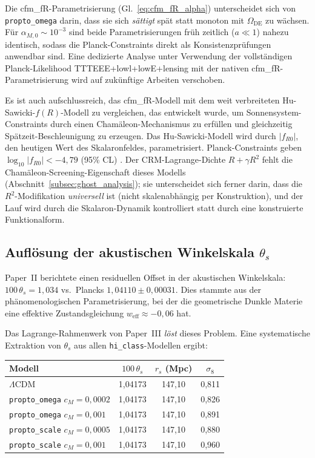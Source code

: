 \documentclass[11pt,a4paper]{article}
\begin{document}
Die cfm\_fR-Parametrisierung (Gl.~\ref{eq:cfm_fR_alpha}) unterscheidet sich von \texttt{propto\_omega} darin, dass sie sich \textit{s\"attigt} sp\"at statt monoton mit $\Omega_{\mathrm{DE}}$ zu w\"achsen. F\"ur $\alpha_{M,0} \sim 10^{-3}$ sind beide Parametrisierungen fr\"uh zeitlich ($a \ll 1$) nahezu identisch, sodass die Planck-Constraints direkt als Konsistenzpr\"ufungen anwendbar sind. Eine dedizierte Analyse unter Verwendung der vollst\"andigen Planck-Likelihood TTTEEE+lowl+lowE+lensing mit der nativen cfm\_fR-Parametrisierung wird auf zuk\"unftige Arbeiten verschoben.

Es ist auch aufschlussreich, das cfm\_fR-Modell mit dem weit verbreiteten Hu-Sawicki-$f(R)$-Modell \cite{HuSawicki2007} zu vergleichen, das entwickelt wurde, um Sonnensystem-Constraints durch einen Cham\"aleon-Mechanismus zu erf\"ullen und gleichzeitig Sp\"atzeit-Beschleunigung zu erzeugen. Das Hu-Sawicki-Modell wird durch $|f_{R0}|$, den heutigen Wert des Skalaronfeldes, parametrisiert. Planck-Constraints geben $\log_{10}|f_{R0}| < -4{,}79$ (95\% CL) \cite{PlanckMG2016}. Der CRM-Lagrange-Dichte $R + \gamma R^2$ fehlt die Cham\"aleon-Screening-Eigenschaft dieses Modells (Abschnitt~\ref{subsec:ghost_analysis}); sie unterscheidet sich ferner darin, dass die $R^2$-Modifikation \textit{universell} ist (nicht skalenabh\"angig per Konstruktion), und der Lauf wird durch die Skalaron-Dynamik kontrolliert statt durch eine konstruierte Funktionalform.

\subsection{Aufl\"osung der akustischen Winkelskala $\theta_s$}
\label{subsec:theta_s}

Paper~II berichtete einen residuellen Offset in der akustischen Winkelskala: $100\,\theta_s = 1{,}034$ vs.\ Plancks $1{,}04110 \pm 0{,}00031$. Dies stammte aus der ph\"anomenologischen Parametrisierung, bei der die geometrische Dunkle Materie eine effektive Zustandsgleichung $w_{\mathrm{eff}} \approx -0{,}06$ hat.

Das Lagrange-Rahmenwerk von Paper~III \textit{l\"ost} dieses Problem. Eine systematische Extraktion von $\theta_s$ aus allen \texttt{hi\_class}-Modellen ergibt:

\begin{center}
\begin{tabular}{lccc}
\toprule
\textbf{Modell} & $100\,\theta_s$ & $r_s$ (Mpc) & $\sigma_8$ \\
\midrule
$\Lambda$CDM & 1,04173 & 147,10 & 0,811 \\
\texttt{propto\_omega} $c_M = 0{,}0002$ & 1,04173 & 147,10 & 0,826 \\
\texttt{propto\_omega} $c_M = 0{,}001$ & 1,04173 & 147,10 & 0,891 \\
\texttt{propto\_scale} $c_M = 0{,}0005$ & 1,04173 & 147,10 & 0,880 \\
\texttt{propto\_scale} $c_M = 0{,}001$ & 1,04173 & 147,10 & 0,960 \\
\bottomrule
\end{tabular}
\label{tab:theta_s}
\end{center}
\end{document}
